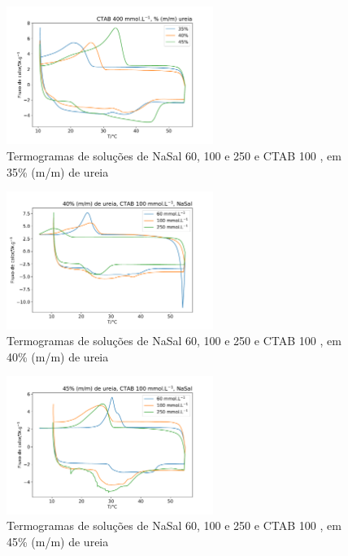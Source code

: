 		\begin{figure}[H]
			\centering
			\includegraphics[width=0.60\textwidth]{./imagens/dsc/NaSal35}
			\caption{Termogramas de soluções de NaSal 60, 100 e 250\mM{} e CTAB 100 \mM{}, em 35\% (m/m) de ureia}
			\label{fig:DSC_NaSal_Ur35}
		\end{figure}
	
		\begin{figure}[H]
			\centering
			\includegraphics[width=0.60\textwidth]{./imagens/dsc/NaSal40}
			\caption{Termogramas de soluções de NaSal 60, 100 e 250\mM{} e CTAB 100 \mM{}, em 40\% (m/m) de ureia}
			\label{fig:DSC_NaSal_Ur40}
		\end{figure}

		\begin{figure}[H]
			\centering
			\includegraphics[width=0.60\textwidth]{./imagens/dsc/NaSal45}
			\caption{Termogramas de soluções de NaSal 60, 100 e 250\mM{} e CTAB 100 \mM{}, em 45\% (m/m) de ureia}
			\label{fig:DSC_NaSal_Ur45}
		\end{figure}

